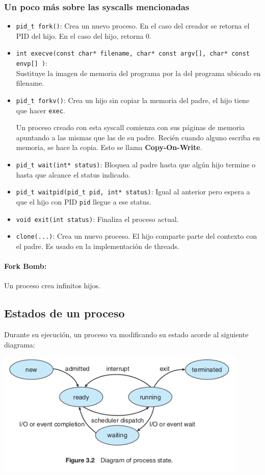 \subsubsection{Un poco más sobre las syscalls mencionadas}
\begin{itemize}
	\item \texttt{pid\_t fork()}: Crea un nuevo proceso. En el caso del creador se retorna el PID del hijo. En el caso del hijo, retorna 0.
	\item \texttt{int\ execve(const char* filename, char* const argv[], char* const envp[] )}: \\ Sustituye la imagen de memoria del programa por la del programa ubicado en filename.
	\item \texttt{pid\_t forkv()}: Crea un hijo sin copiar la memoria del padre, el hijo tiene que hacer \texttt{exec}.

	Un proceso creado con esta syscall comienza con sus páginas de memoria apuntando a las mismas que las de su padre. Recién cuando alguno escriba en memoria, se hace la copia. Esto se llama \textbf{Copy-On-Write}.

	\item \texttt{pid\_t wait(int* status)}: Bloquea al padre hasta que algún hijo termine o hasta que alcance el status indicado.
	\item \texttt{pid\_t waitpid(pid\_t pid, int* status)}: Igual al anterior pero espera a que el hijo con PID \texttt{pid} llegue a ese status.
	\item \texttt{void exit(int status)}: Finaliza el proceso actual.
	\item \texttt{clone(...)}: Crea un nuevo proceso. El hijo comparte parte del contexto con el padre. Es usado en la implementación de threads.
\end{itemize}

\paragraph{Fork Bomb:} Un proceso crea infinitos hijos.
\subsection{Estados de un proceso}\label{procesos::estados}
Durante su ejecución, un proceso va modificando su estado acorde al siguiente diagrama:

\begin{center}
	\vspace*{0.5cm}
	\includegraphics[width=0.9\textwidth]{imagenes/estados-proceso.png}
\end{center}

